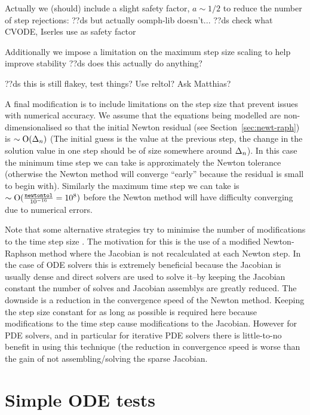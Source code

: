 Actually we (should) include a slight safety factor, $a \sim 1/2$ to reduce the number of step rejections:
??ds but actually oomph-lib doesn't...
??ds check what CVODE, Iserles use as safety factor


Additionally we impose a limitation on the maximum step size scaling to help improve stability ??ds does this actually do anything?


??ds this is still flakey, test things? Use reltol? Ask Matthias?

A final modification is to include limitations on the step size that prevent issues with numerical accuracy.
We assume that the equations being modelled are non-dimensionalised so that the initial Newton residual (see Section~\ref{sec:newt-raph}) is $\sim \text{O}(\Delta_{n})$ (The initial guess is the value at the previous step, the change in the solution value in one step should be of size somewhere around $\Delta_{n}$).
In this case the minimum time step we can take is approximately the Newton tolerance (otherwise the Newton method will converge ``early'' because the residual is small to begin with).
Similarly the maximum time step we can take is $\sim \text{O}(\frac{\texttt{newtontol}}{10^{-16}} = 10^{8})$ before the Newton method will have difficulty converging due to numerical errors.


Note that some alternative strategies try to minimise the number of modifications to the time step size \cite[chap. 6]{Iserles2009} \cite[Sec. 2.1]{cvode-manual}.
The motivation for this is the use of a modified Newton-Raphson method where the Jacobian is not recalculated at each Newton step.
In the case of ODE solvers this is extremely beneficial because the Jacobian is usually dense and direct solvers are used to solve it--by keeping the Jacobian constant the number of solves and Jacobian assemblys are greatly reduced.
The downside is a reduction in the convergence speed of the Newton method.
Keeping the step size constant for as long as possible is required here because modifications to the time step cause modifications to the Jacobian.
However for PDE solvers, and in particular for iterative PDE solvers there is little-to-no benefit in using this technique (the reduction in convergence speed is worse than the gain of not assembling/solving the sparse Jacobian\cite[pg. 128]{Iserles2009}.


\section{Simple ODE tests}
\label{sec:aimr-testing}

